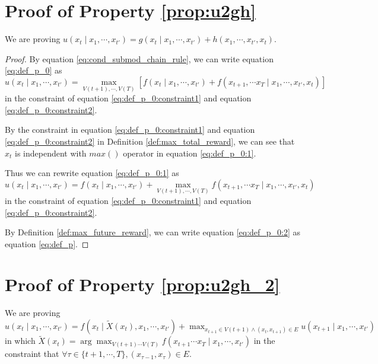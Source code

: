 \documentclass[12pt]{article}
\begin{document}
\section{Proof of Property \ref{prop:u2gh}}
\label{app:proof_prop_u2gh}

We are proving
$ u(x_{t} \mid x_{1} , \cdots , x_{t'} ) = g(x_{t} \mid x_{1} , \cdots , x_{t'} ) + h( x_{1} , \cdots, x_{t'}, x_{t} ) $.

\begin{proof}

By equation \eqref{eq:cond_submod_chain_rule}, we can write equation \eqref{eq:def_p_0} as
\begin{equation}
\label{eq:def_p_0:1}
u(x_{t} \mid x_{1} , \cdots , x_{t'} ) = 
\max_{V(t+1), \cdots ,V(T) } [ f(x_{t} \mid x_{1}, \cdots , x_{t'}) + f( x_{t+1}, \cdots x_{T} \mid x_{1}, \cdots , x_{t'}, x_{t}) ]
\end{equation}
in the constraint of equation \eqref{eq:def_p_0:constraint1} and equation \eqref{eq:def_p_0:constraint2}.

By the constraint in equation \eqref{eq:def_p_0:constraint1} and equation \eqref{eq:def_p_0:constraint2}  in Definition \ref{def:max_total_reward},
we can see that $ x_{t} $ is independent with $ max() $ operator in equation \eqref{eq:def_p_0:1}.

Thus we can rewrite equation \eqref{eq:def_p_0:1} as
\begin{equation}
\label{eq:def_p_0:2}
u(x_{t} \mid x_{1} , \cdots , x_{t'} ) = f(x_{t} \mid x_{1}, \cdots , x_{t'})  + \max_{ V(t+1), \cdots , V(T) } f( x_{t+1}, \cdots x_{T} \mid x_{1}, \cdots , x_{t'}, x_{t})
\end{equation}
in the constraint of equation \eqref{eq:def_p_0:constraint1} and equation \eqref{eq:def_p_0:constraint2}.

By Definition \ref{def:max_future_reward}, we can write equation \eqref{eq:def_p_0:2} as equation \eqref{eq:def_p}.

\end{proof}

\section{Proof of Property \ref{prop:u2gh_2}}
\label{app:proof_prop_u2gh_2}

We are proving
$ u( x_{t} \mid x_{1} , \cdots , x_{t'} ) = f( x_{t} \mid \tilde{X}(x_{t}), x_{1} , \cdots , x_{t'} ) +  \max_{x_{t+1} \in V(t+1) \land ( x_{t}, x_{t+1} ) \in E} u( x_{t+1} \mid x_{1} , \cdots , x_{t'} ) $
in which
$ \tilde{X}(x_{t}) = \arg \max_{ V(t+1) \cdots V(T) } f( x_{t+1} \cdots x_{T} \mid x_{1} , \cdots , x_{t'} ) $
in the constraint that
$ \forall \tau \in \{ t+1 , \cdots , T \},  ( x_{ \tau-1 }, x_{ \tau } ) \in E $.
\end{document}
